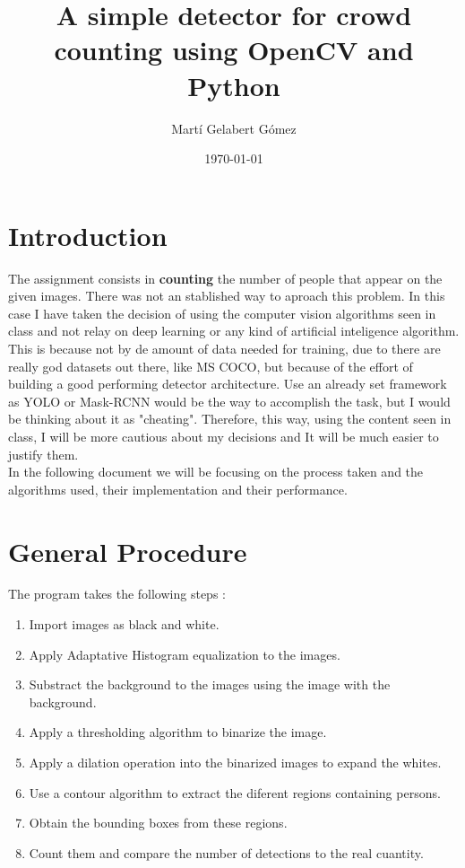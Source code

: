 \documentclass[10pt]{article}
\begin{document}
\title{A simple detector for crowd counting using OpenCV and Python}
\author{Martí Gelabert Gómez}
\date{\today}
\maketitle

\tableofcontents
\section{Introduction}
The assignment consists in \textbf{counting} the number of people that appear on the given images. There was not an stablished way to aproach this problem. In this case I have taken the decision of using the computer vision algorithms seen in class and not relay on deep learning or any kind of artificial inteligence algorithm. This is because not by de amount of data needed for training, due to there are really god datasets out there, like MS COCO, but because of the effort of building a good performing detector architecture. Use an already set framework as YOLO or Mask-RCNN would be the way to accomplish the task, but I would be thinking about it as "cheating". Therefore, this way, using the content seen in class, I will be more cautious about my decisions and It will be much easier to justify them.\\

In the following document  we will be focusing on the process taken and the algorithms used, their implementation and their performance.        

\section{General Procedure}
The program takes the following steps :

\begin{enumerate}
    \item Import images as black and white.
    \item Apply Adaptative Histogram equalization to the images.
    \item Substract the background to the images using the image with the background.
    \item Apply a thresholding algorithm to binarize the image.
    \item Apply a dilation operation into the binarized images to expand the whites.
    \item Use a contour algorithm to extract the diferent regions containing persons.
    \item Obtain the bounding boxes from these regions.
    \item Count them and compare the number of detections to the real cuantity.
    \end{enumerate}
    
\end{document}
